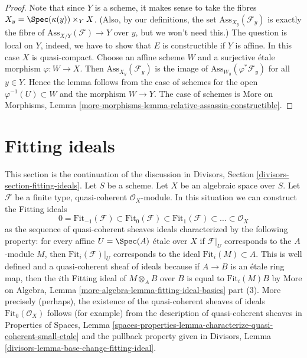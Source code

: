 \begin{proof}
Note that since $Y$ is a scheme, it makes sense to take the fibres
$X_y = \Spec(\kappa(y)) \times_Y X$. (Also, by our definitions, the
set $\text{Ass}_{X_y}(\mathcal{F}_y)$ is exactly the fibre of
$\text{Ass}_{X/Y}(\mathcal{F}) \to Y$ over $y$, but we won't need this.)
The question is local on $Y$, indeed, we have to show that
$E$ is constructible if $Y$ is affine.
In this case $X$ is quasi-compact. Choose an affine scheme $W$
and a surjective \'etale morphism $\varphi : W \to X$.
Then $\text{Ass}_{X_y}(\mathcal{F}_y)$ is the image of
$\text{Ass}_{W_y}(\varphi^*\mathcal{F}_y)$ for all $y \in Y$.
Hence the lemma follows from the case of schemes for
the open $\varphi^{-1}(U) \subset W$ and the morphism $W \to Y$.
The case of schemes is
More on Morphisms, Lemma
\ref{more-morphisms-lemma-relative-assassin-constructible}.
\end{proof}









\section{Fitting ideals}
\label{section-fitting-ideals}

\noindent
This section is the continuation of the discussion in
Divisors, Section \ref{divisors-section-fitting-ideals}.
Let $S$ be a scheme. Let $X$ be an algebraic space over $S$.
Let $\mathcal{F}$ be a finite type, quasi-coherent $\mathcal{O}_X$-module.
In this situation we can construct the Fitting ideals
$$
0 = \text{Fit}_{-1}(\mathcal{F}) \subset \text{Fit}_0(\mathcal{F}) \subset
\text{Fit}_1(\mathcal{F}) \subset \ldots \subset \mathcal{O}_X
$$
as the sequence of quasi-coherent sheaves ideals characterized by the
following property: for every affine $U = \Spec(A)$ \'etale over $X$
if $\mathcal{F}|_U$ corresponds to the $A$-module $M$, then
$\text{Fit}_i(\mathcal{F})|_U$
corresponds to the ideal $\text{Fit}_i(M) \subset A$.
This is well defined and a quasi-coherent sheaf of ideals because
if $A \to B$ is an \'etale ring map, then the $i$th Fitting ideal
of $M \otimes_A B$ over $B$ is equal to $\text{Fit}_i(M) B$ by
More on Algebra, Lemma \ref{more-algebra-lemma-fitting-ideal-basics} part (3).
More precisely (perhaps), the existence of the quasi-coherent sheaves of ideals
$\text{Fit}_0(\mathcal{O}_X)$ follows (for example) from
the description of quasi-coherent sheaves in
Properties of Spaces, Lemma
\ref{spaces-properties-lemma-characterize-quasi-coherent-small-etale}
and the pullback property given in
Divisors, Lemma \ref{divisors-lemma-base-change-fitting-ideal}.

